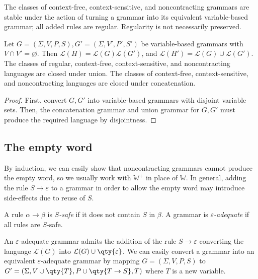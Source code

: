 \begin{remark}
	The classes of context-free, context-sensitive, and noncontracting grammars are stable under the action of turning a grammar into its equivalent variable-based grammar; all added rules are regular.
	Regularity is not necessarily preserved.
\end{remark}
\begin{theorem}
	Let \( G = (\Sigma, V, P, S), G' = (\Sigma, V', P', S') \) be variable-based grammars with \( V \cap V' = \varnothing \).
	Then \( \mathcal L(H) = \mathcal L(G)\mathcal L(G') \), and \( \mathcal L(H') = \mathcal L(G) \cup \mathcal L(G') \).
	The classes of regular, context-free, context-sensitive, and noncontracting languages are closed under union.
	The classes of context-free, context-sensitive, and noncontracting languages are closed under concatenation.
\end{theorem}
\begin{proof}
	First, convert \( G, G' \) into variable-based grammars with disjoint variable sets.
	Then, the concatenation grammar and union grammar for \( G, G' \) must produce the required language by disjointness.
\end{proof}

\subsection{The empty word}
\begin{remark}
	By induction, we can easily show that noncontracting grammars cannot produce the empty word, so we usually work with \( \mathbb W^+ \) in place of \( \mathbb W \).
	In general, adding the rule \( S \to \varepsilon \) to a grammar in order to allow the empty word may introduce side-effects due to reuse of \( S \).
\end{remark}
\begin{definition}
	A rule \( \alpha \to \beta \) is \emph{\( S \)-safe} if it does not contain \( S \) in \( \beta \).
	A grammar is \emph{\( \varepsilon \)-adequate} if all rules are \( S \)-safe.
\end{definition}
An \( \varepsilon \)-adequate grammar admits the addition of the rule \( S \to \varepsilon \) converting the language \( \mathcal L(G) \) into \( \mathcal L(G) \cup \qty{\varepsilon} \).
We can easily convert a grammar into an equivalent \( \varepsilon \)-adequate grammar by mapping \( G = (\Sigma, V, P, S) \) to \( G' = (\Sigma, V \cup \qty{T}, P \cup \qty{T \to S}, T) \) where \( T \) is a new variable.
